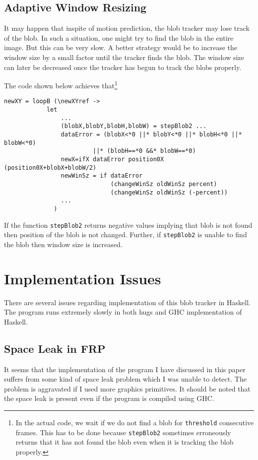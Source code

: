 \documentclass[12pt]{article}
\begin{document}
\subsection{Adaptive Window Resizing}
\par It may happen that inspite of motion prediction, the blob tracker may lose track of the blob. In such a situation, one might try to find the blob in the entire image. But this can be very slow. A better strategy would be to increase the window size by a small factor until the tracker finds the blob. The window size can later be decreased once the tracker has begun to track the blobs properly.
\par The code shown below achieves that\footnote{In the actual code, we wait if we do not find a blob for {\tt threshold} consecutive frames. This has to be done because {\tt stepBlob2} sometimes erroneously returns that it has not found the blob even when it is tracking the blob properly.}
\begin{verbatim}
newXY = loopB (\newXYref ->
            let
                ...
                (blobX,blobY,blobH,blobW) = stepBlob2 ...
                dataError = (blobX<*0 ||* blobY<*0 ||* blobH<*0 ||* blobW<*0)
                         ||* (blobH==*0 &&* blobW==*0)
                newX=ifX dataError position0X (position0X+blobX+blobW/2)
                newWinSz = if dataError 
                              (changeWinSz oldWinSz percent)
                              (changeWinSz oldWinSz (-percent))
                ...
              )
\end{verbatim}
\par If the function {\tt stepBlob2} returns negative values implying that blob is not found then position of the blob is not changed. Further, if {\tt stepBlob2} is unable to find the blob then window size is increased.
\section{Implementation Issues}
There are several issues regarding implementation of this blob tracker in Haskell. The program runs extremely slowly in both hugs and GHC implementation of Haskell. 
\subsection{Space Leak in FRP}
\par It seems that the implementation of the program I have discussed in this paper suffers from some kind of space leak problem which I was unable to detect. The problem is aggravated if I used more graphics primitives. It should be noted that the space leak is present even if the program is compiled using GHC.
\end{document}
